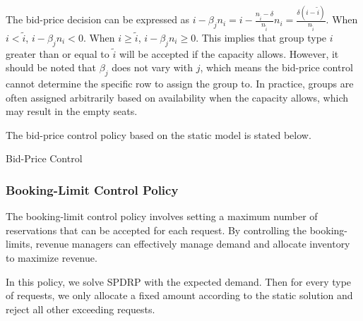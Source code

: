 The bid-price decision can be expressed as $i - \beta_j n_i = i - \frac{n_{\tilde{i}} - \delta}{n_{\tilde{i}}} n_i = \frac{\delta (i - \tilde{i})}{n_{\tilde{i}}}$. When $i < \tilde{i}$, $i - \beta_j n_i < 0$. When $i \geq \tilde{i}$, $i - \beta_j n_i \geq 0$. This implies that group type $i$ greater than or equal to $\tilde{i}$ will be accepted if the capacity allows. However, it should be noted that $\beta_j$ does not vary with $j$, which means the bid-price control cannot determine the specific row to assign the group to. In practice, groups are often assigned arbitrarily based on availability when the capacity allows, which may result in the empty seats.

The bid-price control policy based on the static model is stated below.

\begin{algorithm}[H]
  \caption{Bid-Price Control}\label{algo_bid}
\end{algorithm}


\subsubsection*{Booking-Limit Control Policy}
The booking-limit control policy involves setting a maximum number of reservations that can be accepted for each request. By controlling the booking-limits, revenue managers can effectively manage demand and allocate inventory to maximize revenue.

In this policy, we solve SPDRP with the expected demand. Then for every type of requests, we only allocate a fixed amount according to the static solution and reject all other exceeding requests. 



